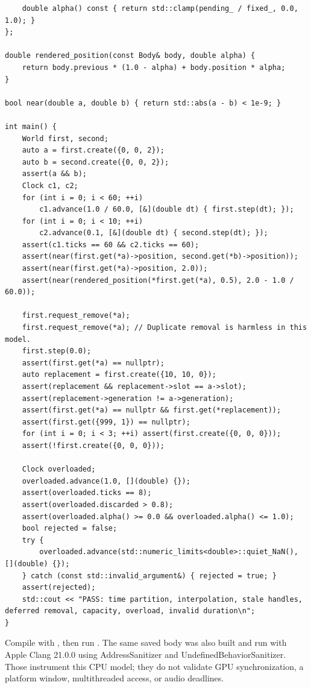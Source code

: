 \begin{verbatim}
    double alpha() const { return std::clamp(pending_ / fixed_, 0.0, 1.0); }
};

double rendered_position(const Body& body, double alpha) {
    return body.previous * (1.0 - alpha) + body.position * alpha;
}

bool near(double a, double b) { return std::abs(a - b) < 1e-9; }

int main() {
    World first, second;
    auto a = first.create({0, 0, 2});
    auto b = second.create({0, 0, 2});
    assert(a && b);
    Clock c1, c2;
    for (int i = 0; i < 60; ++i)
        c1.advance(1.0 / 60.0, [&](double dt) { first.step(dt); });
    for (int i = 0; i < 10; ++i)
        c2.advance(0.1, [&](double dt) { second.step(dt); });
    assert(c1.ticks == 60 && c2.ticks == 60);
    assert(near(first.get(*a)->position, second.get(*b)->position));
    assert(near(first.get(*a)->position, 2.0));
    assert(near(rendered_position(*first.get(*a), 0.5), 2.0 - 1.0 / 60.0));

    first.request_remove(*a);
    first.request_remove(*a); // Duplicate removal is harmless in this model.
    first.step(0.0);
    assert(first.get(*a) == nullptr);
    auto replacement = first.create({10, 10, 0});
    assert(replacement && replacement->slot == a->slot);
    assert(replacement->generation != a->generation);
    assert(first.get(*a) == nullptr && first.get(*replacement));
    assert(first.get({999, 1}) == nullptr);
    for (int i = 0; i < 3; ++i) assert(first.create({0, 0, 0}));
    assert(!first.create({0, 0, 0}));

    Clock overloaded;
    overloaded.advance(1.0, [](double) {});
    assert(overloaded.ticks == 8);
    assert(overloaded.discarded > 0.8);
    assert(overloaded.alpha() >= 0.0 && overloaded.alpha() <= 1.0);
    bool rejected = false;
    try {
        overloaded.advance(std::numeric_limits<double>::quiet_NaN(), [](double) {});
    } catch (const std::invalid_argument&) { rejected = true; }
    assert(rejected);
    std::cout << "PASS: time partition, interpolation, stale handles, deferred removal, capacity, overload, invalid duration\n";
}
\end{verbatim}

Compile with , then run . The same saved body was also built and run with Apple Clang 21.0.0 using AddressSanitizer and UndefinedBehaviorSanitizer. Those instrument this CPU model; they do not validate GPU synchronization, a platform window, multithreaded access, or audio deadlines.

